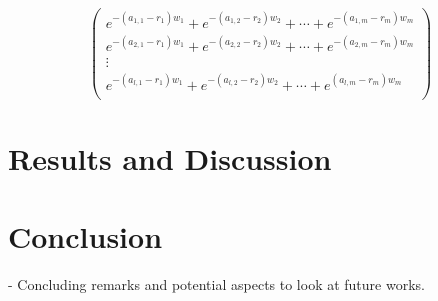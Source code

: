 \[
\begin{pmatrix}

e^{-(a_{1,1} - r_1)w_1} + e^{-(a_{1,2} - r_2)w_2} + \cdots + e^{-(a_{1,m} - r_m)w_m} \\
e^{-(a_{2,1} - r_1)w_1} + e^{-(a_{2,2} - r_2)w_2} + \cdots + e^{-(a_{2,m} - r_m)w_m} \\
\vdots \\
e^{-(a_{l,1} - r_1)w_1} + e^{-(a_{l,2} - r_2)w_2} + \cdots + e^{(a_{l,m} - r_m)w_m} \\

\end{pmatrix}
\]


\chapter{Results and Discussion}


\chapter{Conclusion}

- Concluding remarks and potential aspects to look at future works.





















